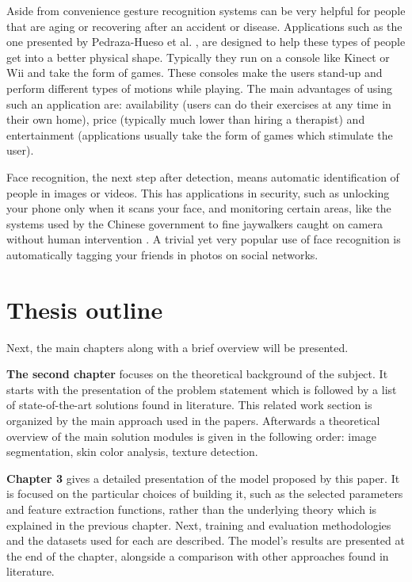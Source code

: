 \documentclass[12pt]{report}
\begin{document}
	Aside from convenience gesture recognition systems can be very helpful for people that are aging or recovering after an accident or disease. Applications such as the one presented by Pedraza-Hueso et al. \cite{rehabilitation_kinect}, are designed to help these types of people get into a better physical shape. Typically they run on a console like Kinect or Wii and take the form of games. These consoles make the users stand-up and perform different types of motions while playing. The main advantages of using such an application are: availability (users can do their exercises at any time in their own home), price (typically much lower than hiring a therapist) and entertainment (applications usually take the form of games which stimulate the user).
	
	Face recognition, the next step after detection, means automatic identification of people in images or videos\cite{detecting_faces_a_survey}. This has applications in security, such as unlocking your phone only when it scans your face, and monitoring certain areas, like the systems used by the Chinese government to fine jaywalkers caught on camera without human intervention \cite{jaywalkers_china}. A trivial yet very popular use of face recognition is automatically tagging your friends in photos on social networks.
	
	\section{Thesis outline}
	Next, the main chapters along with a brief overview will be presented.
	
	\textbf{The second chapter} focuses on the theoretical background of the subject. It starts with the presentation of the problem statement which is followed by a list of state-of-the-art solutions found in literature. This related work section is organized by the main approach used in the papers. Afterwards a theoretical overview of the main solution modules is given in the following order: image segmentation, skin color analysis, texture detection.
	
	\textbf{Chapter 3} gives a detailed presentation of the model proposed by this paper. It is focused on the particular choices of building it, such as the selected parameters and feature extraction functions, rather than the underlying theory which is explained in the previous chapter. Next, training and evaluation methodologies and the datasets used for each are described. The model's results are presented at the end of the chapter, alongside a comparison with other approaches found in literature.
	
\end{document}
